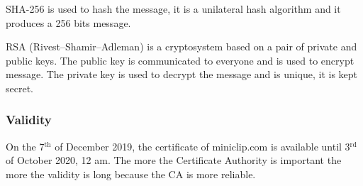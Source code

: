 \documentclass{article}
\begin{document}
SHA-256 is used to hash the message, it is a unilateral hash algorithm and it produces a 256 bits message.

RSA (Rivest–Shamir–Adleman) is a cryptosystem based on a pair of private and public keys. The public key is communicated to everyone and is used to encrypt message. The private key is used to decrypt the message and is unique, it is kept secret.


\subsubsection{Validity}

On the 7$^{\text{th}}$ of December 2019, the certificate of miniclip.com is available until 3$^{\text{rd}}$ of October 2020, 12 am. The more the Certificate Authority is important the more the validity is long because the CA is more reliable.




\end{document}
